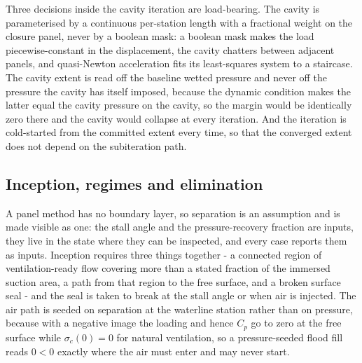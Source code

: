 \documentclass[11pt,a4paper]{article}
\begin{document}
Three decisions inside the cavity iteration are load-bearing. The cavity is
parameterised by a continuous per-station length with a fractional weight on the
closure panel, never by a boolean mask: a boolean mask makes the load
piecewise-constant in the displacement, the cavity chatters between adjacent
panels, and quasi-Newton acceleration fits its least-squares system to a
staircase. The cavity extent is read off the baseline wetted pressure and
never off the pressure the cavity has itself imposed, because the dynamic
condition makes the latter equal the cavity pressure on the cavity, so the
margin would be identically zero there and the cavity would collapse at every
iteration. And the iteration is cold-started from the committed extent every
time, so that the converged extent does not depend on the subiteration path.

\subsection{Inception, regimes and elimination}
\label{subsec:Regimes}

A panel method has no boundary layer, so separation is an assumption and is made
visible as one: the stall angle and the pressure-recovery fraction are inputs,
they live in the state where they can be inspected, and every case reports them
as inputs. Inception requires three things together - a connected region of
ventilation-ready flow covering more than a stated fraction of the immersed
suction area, a path from that region to the free surface, and a broken surface
seal - and the seal is taken to break at the stall angle or when air is injected.
The air path is seeded on separation at the waterline station rather than
on pressure, because with a negative image the loading and hence $C_p$ go to zero
at the free surface while $\sigma_c(0) = 0$ for natural ventilation, so a
pressure-seeded flood fill reads $0 < 0$ exactly where the air must enter and may
never start.
\end{document}
